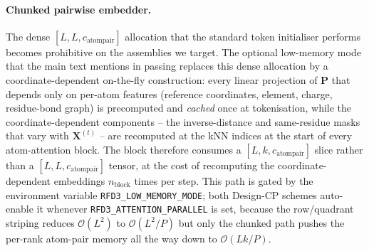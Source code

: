 \documentclass{article}
\theoremstyle{plain}
\theoremstyle{definition}
\theoremstyle{remark}
\begin{document}
\paragraph{Chunked pairwise embedder.} The dense $[L,L,c_\text{atompair}]$ allocation that the standard token initialiser performs becomes prohibitive on the assemblies we target. The optional low-memory mode that the main text mentions in passing replaces this dense allocation by a coordinate-dependent on-the-fly construction: every linear projection of $\mathbf{P}$ that depends only on per-atom features (reference coordinates, element, charge, residue-bond graph) is precomputed and \emph{cached} once at tokenisation, while the coordinate-dependent components -- the inverse-distance and same-residue masks that vary with $\mathbf{X}^{(t)}$ -- are recomputed at the kNN indices at the start of every atom-attention block. The block therefore consumes a $[L,k,c_\text{atompair}]$ slice rather than a $[L,L,c_\text{atompair}]$ tensor, at the cost of recomputing the coordinate-dependent embeddings $n_\text{block}$ times per step. This path is gated by the environment variable \texttt{RFD3\_LOW\_MEMORY\_MODE}; both Design-CP schemes auto-enable it whenever \texttt{RFD3\_ATTENTION\_PARALLEL} is set, because the row/quadrant striping reduces $\mathcal{O}(L^2)$ to $\mathcal{O}(L^2/P)$ but only the chunked path pushes the per-rank atom-pair memory all the way down to $\mathcal{O}(Lk/P)$.
\end{document}
